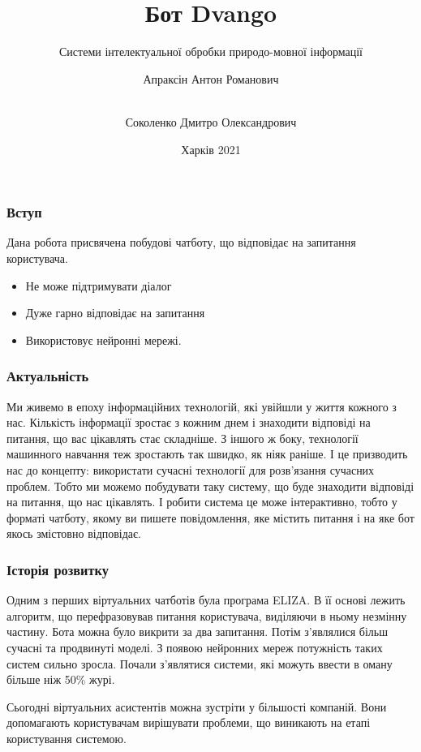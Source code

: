 \documentclass{beamer}
\title{Бот Dvango}
\subtitle{Системи інтелектуальної обробки природо-мовної інформації}
\author[Апраксін, Соколенко]{
    Апраксін Антон Романович
    \and\\
    Соколенко Дмитро Олександрович
}
\institute[ХНУРЕ]{ІТШІ-18-1}
\date{Харків 2021}
\begin{document}
\frame{\titlepage}

\begin{frame}
    \frametitle{Вступ}
    Дана робота присвячена побудові чатботу, що відповідає на запитання користувача.

    \begin{itemize}
        \item Не може підтримувати діалог
        \item Дуже гарно відповідає на запитання
        \item Використовує нейронні мережі.
    \end{itemize}
    
\end{frame}

\begin{frame}
    \frametitle{Актуальність}
    Ми живемо в епоху інформаційних технологій, які увійшли у життя кожного з нас. Кількість інформації зростає з кожним днем і знаходити відповіді на питання, що вас цікавлять стає складніше. З іншого ж боку, технології машинного навчання теж зростають так швидко, як ніяк раніше. І це призводить нас до концепту: використати сучасні технології для розв'язання сучасних проблем. Тобто ми можемо побудувати таку систему, що буде знаходити відповіді на питання, що нас цікавлять. І робити система це може інтерактивно, тобто у форматі чатботу, якому ви пишете повідомлення, яке містить питання і на яке бот якось змістовно відповідає.
\end{frame}

\begin{frame}
    \frametitle{Історія розвитку}
    Одним з перших віртуальних чатботів була програма ELIZA. В її основі лежить алгоритм, що перефразовував питання користувача, виділяючи в ньому незмінну частину. Бота можна було викрити за два запитання. Потім з'являлися більш сучасні та продвинуті моделі. З появою нейронних мереж потужність таких систем сильно зросла. Почали з'являтися системи, які можуть ввести в оману більше ніж 50\% журі. 

    Сьогодні віртуальних асистентів можна зустріти у більшості компаній. Вони допомагають користувачам вирішувати проблеми, що виникають на етапі користування системою.
\end{frame}
\end{document}
